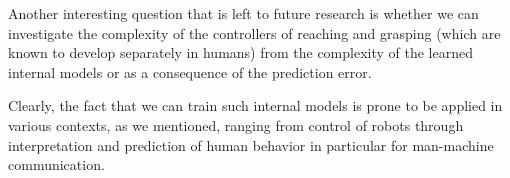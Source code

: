 Another interesting question that is left to future research is
whether we can investigate the complexity of the controllers of
reaching and grasping (which are known to develop separately in
humans) from the complexity of the learned internal models or as a
consequence of the prediction error.

Clearly, the fact that we can train such internal models is prone to
be applied in various contexts, as we mentioned, ranging from control
of robots through interpretation and prediction of human behavior in
particular for man-machine communication.
